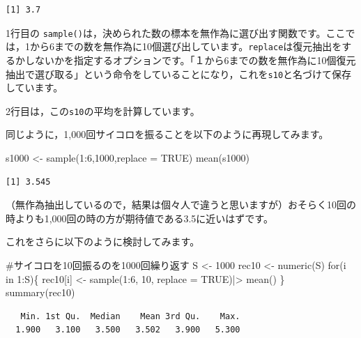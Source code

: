 \documentclass[
  letterpaper,
  DIV=11,
  numbers=noendperiod]{scrreprt}
\newenvironment{Shaded}{\begin{snugshade}}{\end{snugshade}}
\newcommand{\AttributeTok}[1]{\textcolor[rgb]{0.40,0.45,0.13}{#1}}
\newcommand{\CommentTok}[1]{\textcolor[rgb]{0.37,0.37,0.37}{#1}}
\newcommand{\ConstantTok}[1]{\textcolor[rgb]{0.56,0.35,0.01}{#1}}
\newcommand{\ControlFlowTok}[1]{\textcolor[rgb]{0.00,0.23,0.31}{#1}}
\newcommand{\DecValTok}[1]{\textcolor[rgb]{0.68,0.00,0.00}{#1}}
\newcommand{\FunctionTok}[1]{\textcolor[rgb]{0.28,0.35,0.67}{#1}}
\newcommand{\NormalTok}[1]{\textcolor[rgb]{0.00,0.23,0.31}{#1}}
\newcommand{\OtherTok}[1]{\textcolor[rgb]{0.00,0.23,0.31}{#1}}
\newcommand{\SpecialCharTok}[1]{\textcolor[rgb]{0.37,0.37,0.37}{#1}}
\begin{document}
\begin{verbatim}
[1] 3.7
\end{verbatim}

1行目の
\texttt{sample()}は，決められた数の標本を無作為に選び出す関数です。ここでは，1から6までの数を無作為に10個選び出しています。\texttt{replace}は復元抽出をするかしないかを指定するオプションです。「１から6までの数を無作為に10個復元抽出で選び取る」という命令をしていることになり，これを\texttt{s10}と名づけて保存しています。

2行目は，この\texttt{s10}の平均を計算しています。

同じように，1,000回サイコロを振ることを以下のように再現してみます。

\begin{Shaded}
\begin{Highlighting}[]
\NormalTok{s1000 }\OtherTok{\textless{}{-}} \FunctionTok{sample}\NormalTok{(}\DecValTok{1}\SpecialCharTok{:}\DecValTok{6}\NormalTok{,}\DecValTok{1000}\NormalTok{,}\AttributeTok{replace =} \ConstantTok{TRUE}\NormalTok{)}
\FunctionTok{mean}\NormalTok{(s1000)}
\end{Highlighting}
\end{Shaded}

\begin{verbatim}
[1] 3.545
\end{verbatim}

（無作為抽出しているので，結果は個々人で違うと思いますが）おそらく10回の時よりも1,000回の時の方が期待値である3.5に近いはずです。

これをさらに以下のように検討してみます。

\begin{Shaded}
\begin{Highlighting}[]
\CommentTok{\#サイコロを10回振るのを1000回繰り返す}
\NormalTok{S }\OtherTok{\textless{}{-}} \DecValTok{1000}
\NormalTok{rec10 }\OtherTok{\textless{}{-}} \FunctionTok{numeric}\NormalTok{(S)}
\ControlFlowTok{for}\NormalTok{(i }\ControlFlowTok{in} \DecValTok{1}\SpecialCharTok{:}\NormalTok{S)\{}
\NormalTok{  rec10[i] }\OtherTok{\textless{}{-}} \FunctionTok{sample}\NormalTok{(}\DecValTok{1}\SpecialCharTok{:}\DecValTok{6}\NormalTok{, }\DecValTok{10}\NormalTok{, }\AttributeTok{replace =} \ConstantTok{TRUE}\NormalTok{)}\SpecialCharTok{|\textgreater{}}
    \FunctionTok{mean}\NormalTok{()}
\NormalTok{\}}
\FunctionTok{summary}\NormalTok{(rec10)}
\end{Highlighting}
\end{Shaded}

\begin{verbatim}
   Min. 1st Qu.  Median    Mean 3rd Qu.    Max. 
  1.900   3.100   3.500   3.502   3.900   5.300 
\end{verbatim}
\end{document}
